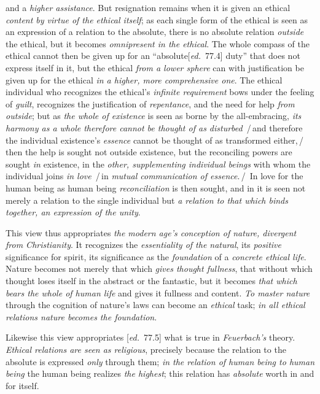 \documentclass[12pt,a4paper,openany]{book}
\newcommand{\kpage}[1]{\marginnote{\footnotesize\textit{[#1]}}}
\newcommand{\ed}[1]{{\small[\textit{ed.}\ #1]}}
\newcommand{\ins}[1]{\,/\,#1\,/\,}
\begin{document}
and a
\emph{higher assistance}. But resignation remains when it is given an ethical \emph{content
by virtue of the ethical itself}; as each single form of the ethical is seen
as an expression of a relation to the absolute, there is no absolute
relation \emph{outside} the ethical, but it becomes \emph{omnipresent in the
ethical}. The whole compass of the ethical cannot then be given up for an ``absolute\ed{77.4}
duty'' that does not express itself in it, but the ethical \emph{from a
lower sphere} can with justification be given up for the ethical \emph{in a higher,
more comprehensive one}. The ethical individual who recognizes the ethical's
\emph{infinite requirement} bows under the feeling of \emph{guilt}, recognizes the justification of \emph{repentance},
and the need for help \emph{from outside}; but as \emph{the whole
of existence} is seen as borne by the all-embracing, \emph{its harmony as
a whole therefore cannot be thought of as disturbed} \ins{and therefore the individual existence's\kpage{184}
\emph{essence} cannot be thought of as transformed either,} then the help is sought not
outside existence, but the reconciling powers are sought \emph{in} existence,
in the \emph{other, supplementing individual beings} with whom the individual joins
\emph{in love} \ins{in \emph{mutual communication of essence}.} In love for
the human being as human being \emph{reconciliation} is then sought, and in it is seen
not merely a relation to the single individual but \emph{a relation to that which binds together,
an expression of the unity}.

This view thus appropriates \emph{the modern age's conception of nature, divergent
from Christianity}. It recognizes the \emph{essentiality of the natural},
its \emph{positive} significance for spirit, its significance as the \emph{foundation}
of a \emph{concrete ethical life}. Nature becomes not merely that which \emph{gives
thought fullness}, that without which thought loses itself in the abstract or the
fantastic, but it becomes \emph{that which bears the whole of human life} and
gives it fullness and content. \emph{To master nature} through the cognition
of nature's laws can become an \emph{ethical} task; \emph{in all ethical relations
nature becomes the foundation}.

Likewise this view appropriates \ed{77.5} what is true in \emph{Feuerbach's}
theory. \emph{Ethical relations are seen as religious}, precisely because the relation
to the absolute is expressed \emph{only} through them; \emph{in the relation of human being to
human being} the human being realizes \emph{the highest}; this relation has \emph{absolute}
worth in and for itself.
\end{document}
